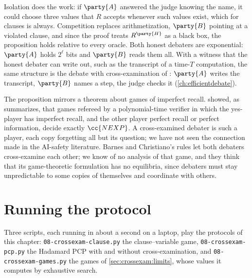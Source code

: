 \begin{refsection}
Isolation does the work: if $\party{A}$ answered the judge knowing the name, it could choose three values that $R$ accepts whenever such values exist, which for clauses is always. Competition replaces arithmetization, $\party{B}$ pointing at a violated clause, and since the proof treats $R^{\party{H}}$ as a black box, the proposition holds relative to every oracle. Both honest debaters are exponential: $\party{A}$ holds $2^\ell$ bits and $\party{B}$ reads them all. With a witness that the honest debater can write out, such as the transcript of a time-$T$ computation, the same structure is the debate with cross-examination of \textcite[Theorem~5.3]{BrownCohenEtAl2024}: $\party{A}$ writes the transcript, $\party{B}$ names a step, the judge checks it (\cref{ch:efficientdebate}).

The proposition mirrors a theorem about games of imperfect recall. \Textcite{FeigenbaumKollerShor1995} showed, as \textcite{Feigenbaum1998} summarizes, that games refereed by a polynomial-time verifier in which the yes-player has imperfect recall, and the other player perfect recall or perfect information, decide exactly $\cc{NEXP}$. A cross-examined debater is such a player, each copy forgetting all but its question; we have not seen the connection made in the AI-safety literature. Barnes and Christiano's rules let both debaters cross-examine each other; we know of no analysis of that game, and they think that its game-theoretic formulation has no equilibria, since debaters must stay unpredictable to some copies of themselves and coordinate with others.

\section{Running the protocol}\label{sec:crossexam:running}

Three scripts, each running in about a second on a laptop, play the protocols of this chapter: \texttt{08-\allowbreak crossexam-\allowbreak clause.py} the clause--variable game, \texttt{08-\allowbreak crossexam-\allowbreak pcp.py} the Hadamard PCP with and without cross-examination, and \texttt{08-\allowbreak crossexam-\allowbreak games.py} the games of \cref{sec:crossexam:limits}, whose values it computes by exhaustive search.


\end{refsection}
